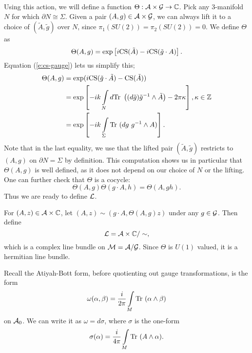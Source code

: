	Using this action, we will define a function $\Theta:\mathcal{A}\times \mathcal{G} \to \mathbb{C}$. Pick any 3-manifold $N$ for which $\partial N \cong \Sigma$. Given a pair $(A,g) \in \mathcal{A}\times\mathcal{G}$, we can always lift it to a choice of $(\tilde{A}, \tilde{g})$ over $N$, since $\pi_1(SU(2)) = \pi_2(SU(2)) = 0$. We define $\Theta$ as
	\begin{equation}
	\Theta(A,g) = \exp\left[i\text{CS}(\tilde{A}) - i\text{CS}(\tilde{g}\cdot A)\right].
	\end{equation}
	Equation (\ref{e:cs-gauge}) lets us simplify this;
	\begin{align*}
	\Theta(A,g) &= \exp(i \text{CS}(\tilde{g}\cdot \tilde{A}) - \text{CS}(\tilde{A}))\\
	&= \exp\left[-ik \int\limits_N d\text{Tr }\left((d\tilde{g})\tilde{g}^{-1}\wedge \tilde{A}\right) - 2\pi \kappa\right], \kappa \in \mathbb{Z}\\
	&= \exp\left[-ik \int\limits_{\Sigma} \text{Tr }(dg~ g^{-1}\wedge A)\right].
	\end{align*}
	Note that in the last equality, we use that the lifted pair $(\tilde{A},\tilde{g})$ restricts to $(A,g)$ on $\partial N = \Sigma$ by definition. This computation shows us in particular that $\Theta(A,g)$ is well defined, as it does not depend on our choice of $N$ or the lifting. One can further check that $\Theta$ is a cocycle:
	\begin{equation}
	\Theta(A,g)\Theta(g\cdot A, h) = \Theta(A,gh).
	\end{equation}
	Thus we are ready to define $\mathcal{L}$.
	\begin{definition}
		\label{d:cs-bundle}
		For $(A,z)\in \mathcal{A}\times \mathbb{C}$, let $(A,z)\sim (g\cdot A, \Theta(A,g)z)$ under any $g\in \mathcal{G}$. Then define
		\begin{equation}
		\mathcal{L} = \mathcal{A}\times \mathbb{C} / \sim,
		\end{equation}
		which is a complex line bundle on $\mathcal{M} = \mathcal{A}/\mathcal{G}$. Since $\Theta$ is $U(1)$ valued, it is a hermitian line bundle.
	\end{definition}
	Recall the Atiyah-Bott form, before quotienting out gauge transformations, is the form 
	\begin{equation}
	\omega(\alpha,\beta) = \frac{i}{2\pi}\int\limits_M \text{Tr }(\alpha\wedge \beta)
	\end{equation}
	on $\mathcal{A}_0$. We can write it as $\omega = d\sigma$, where $\sigma$ is the one-form
	\begin{equation}
	\sigma(\alpha) = \frac{i}{4\pi}\int\limits_M \text{Tr }(A\wedge \alpha).
	\end{equation}

